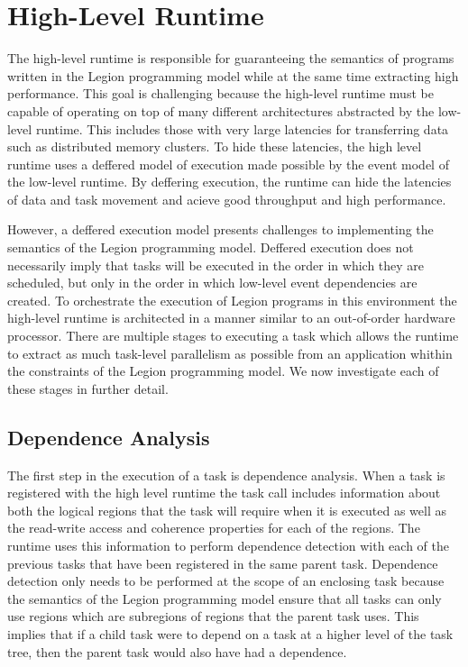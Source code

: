 
\section{High-Level Runtime} 
\label{sec:highlevel}
The high-level runtime is responsible for guaranteeing the semantics 
of programs written in the Legion programming model while at the same
time extracting high performance.  This goal is challenging because
the high-level runtime must be capable of operating on top of many 
different architectures abstracted by the low-level runtime.  This 
includes those with very large latencies for transferring data such
as distributed memory clusters.  To hide these latencies, the high
level runtime uses a deffered model of execution made possible by the
event model of the low-level runtime.  By deffering execution, the 
runtime can hide the latencies of data and task movement and acieve
good throughput and high performance.

However, a deffered execution model presents challenges to implementing
the semantics of the Legion programming model.  Deffered execution
does not necessarily imply that tasks will be executed in the order in
which they are scheduled, but only in the order in which low-level
event dependencies are created.  To orchestrate the execution of Legion
programs in this environment the high-level runtime is architected
in a manner similar to an out-of-order hardware processor.  There are
multiple stages to executing a task which allows the runtime to extract
as much task-level parallelism as possible from an application whithin
the constraints of the Legion programming model.  We now investigate
each of these stages in further detail.

\subsection{Dependence Analysis} 
\label{subsec:depanalysis}
The first step in the execution of a task is dependence analysis.  When
a task is registered with the high level runtime the task call includes
information about both the logical regions that the task will require
when it is executed as well as the read-write access and coherence properties
for each of the regions.  The runtime uses this information to perform
dependence detection with each of the previous tasks that have been registered
in the same parent task.  Dependence detection only needs to be performed at
the scope of an enclosing task because the semantics of the Legion programming
model ensure that all tasks can only use regions which are subregions of
regions that the parent task uses.  This implies that if a child task were
to depend on a task at a higher level of the task tree, then the
parent task would also have had a dependence.  

